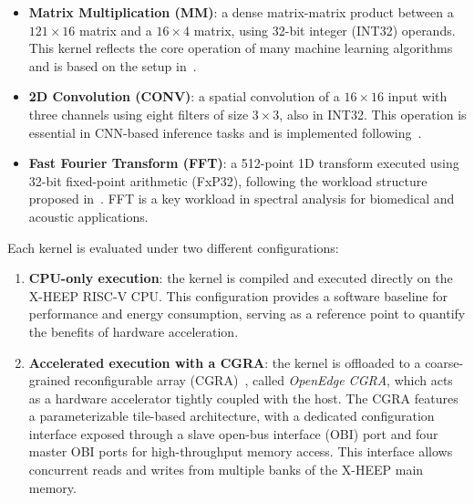             \vspace{-1em}
            \begin{itemize}
                \item \textbf{Matrix Multiplication (MM)}: a dense matrix-matrix product between a $121 \times 16$ matrix and a $16 \times 4$ matrix, using 32-bit integer (INT32) operands. This kernel reflects the core operation of many machine learning algorithms and is based on the setup in~\cite{najafi2024versasens}.
                
                \item \textbf{2D Convolution (CONV)}: a spatial convolution of a $16 \times 16$ input with three channels using eight filters of size $3 \times 3$, also in INT32. This operation is essential in CNN-based inference tasks and is implemented following~\cite{carpentieri2024performance}.
                
                \item \textbf{Fast Fourier Transform (FFT)}: a 512-point 1D transform executed using 32-bit fixed-point arithmetic (FxP32), following the workload structure proposed in~\cite{denkinger2022vwr2a}. FFT is a key workload in spectral analysis for biomedical and acoustic applications.
            \end{itemize}
            \vspace{-1em}
            
            Each kernel is evaluated under two different configurations:

            \vspace{-1em}
            \begin{enumerate}
                \item \textbf{CPU-only execution}: the kernel is compiled and executed directly on the \mbox{X-HEEP} RISC-V CPU. This configuration provides a software baseline for performance and energy consumption, serving as a reference point to quantify the benefits of hardware acceleration.
            
                \item \textbf{Accelerated execution with a CGRA}: the kernel is offloaded to a coarse-grained reconfigurable array (CGRA)~\cite{oe-cgra}, called \textit{OpenEdge CGRA}, which acts as a hardware accelerator tightly coupled with the host. The CGRA features a parameterizable tile-based architecture, with a dedicated configuration interface exposed through a slave open-bus interface (OBI) port and four master OBI ports for high-throughput memory access. This interface allows concurrent reads and writes from multiple banks of the \mbox{X-HEEP} main memory.
            \end{enumerate}
            \vspace{-1em}
            
